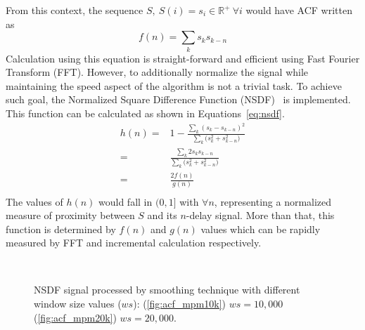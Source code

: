 From this context, the sequence $S,\: S(i)=s_i \in \mathbb{R^+} \: \forall i$ would have ACF written as
\[
 f(n)=\sum_{k}{s_{k}s_{k-n}}   
\]
Calculation using this equation is straight-forward and efficient using Fast Fourier Transform (FFT).
However, to additionally normalize the signal while maintaining the speed aspect of the algorithm is not a trivial task.
To achieve such goal, the Normalized Square Difference Function (NSDF)~\cite{Mcleod2005tartini} is implemented. This function can be calculated as shown in Equations~\ref{eq:nsdf}.
\begin{equation}
\label{eq:nsdf}   
\begin{array}{rr}
h(n)=& 1-\frac  {\displaystyle \sum_k{(s_k-s_{k-n})^2}}
                {\displaystyle \sum_k{(s_k^2+s_{k-n}^2})} \\
    =& \frac{\displaystyle \sum_{k}{2s_{k}s_{k-n}}}
            {\displaystyle \sum_k{(s_k^2+s_{k-n}^2})}\\
    =& \frac{\displaystyle 2f(n)}{\displaystyle g(n)}\\
\end{array}
\end{equation}
The values of $h(n)$ would fall in $(0,1]$ with $\forall n$, representing a normalized measure of proximity between $S$ and its $n$-delay signal. 
More than that, this function is determined by $f(n)$ and $g(n)$ values which can be rapidly measured by FFT and incremental calculation respectively.

\begin{figure}[!hpt]
\centering
{}
\\
\caption[NSDF signal processed by smoothing technique with different window size]{NSDF signal processed by smoothing technique with different window size values ($ws$): (\ref{fig:acf_mpm10k}) $ws=10,000$ (\ref{fig:acf_mpm20k}) $ws=20,000$.}
\label{fig:concat_acf_raw}
\end{figure}

